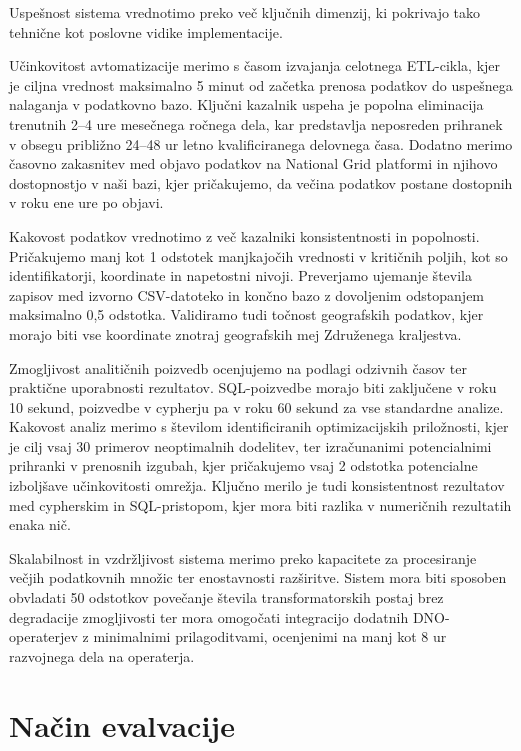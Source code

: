 \documentclass[a4paper,12pt,openright]{book}
\begin{document}
Uspešnost sistema vrednotimo preko več ključnih dimenzij, ki pokrivajo tako tehnične kot poslovne vidike implementacije.

Učinkovitost avtomatizacije merimo s časom izvajanja celotnega ETL-cikla, kjer je ciljna vrednost maksimalno 5 minut od začetka prenosa podatkov do uspešnega nalaganja v podatkovno bazo. Ključni kazalnik uspeha je popolna eliminacija trenutnih 2–4 ure mesečnega ročnega dela, kar predstavlja neposreden prihranek v obsegu približno 24–48 ur letno kvalificiranega delovnega časa. Dodatno merimo časovno zakasnitev med objavo podatkov na National Grid platformi in njihovo dostopnostjo v naši bazi, kjer pričakujemo, da večina podatkov postane dostopnih v roku ene ure po objavi.

Kakovost podatkov vrednotimo z več kazalniki konsistentnosti in popolnosti. Pričakujemo manj kot 1 odstotek manjkajočih vrednosti v kritičnih poljih, kot so identifikatorji, koordinate in napetostni nivoji. Preverjamo ujemanje števila zapisov med izvorno CSV-datoteko in končno bazo z dovoljenim odstopanjem maksimalno 0,5 odstotka. Validiramo tudi točnost geografskih podatkov, kjer morajo biti vse koordinate znotraj geografskih mej Združenega kraljestva.

Zmogljivost analitičnih poizvedb ocenjujemo na podlagi odzivnih časov ter praktične uporabnosti rezultatov. SQL-poizvedbe morajo biti zaključene v roku 10 sekund, poizvedbe v cypherju pa v roku 60 sekund za vse standardne analize. Kakovost analiz merimo s številom identificiranih optimizacijskih priložnosti, kjer je cilj vsaj 30 primerov neoptimalnih dodelitev, ter izračunanimi potencialnimi prihranki v prenosnih izgubah, kjer pričakujemo vsaj 2 odstotka potencialne izboljšave učinkovitosti omrežja. Ključno merilo je tudi konsistentnost rezultatov med cypherskim in SQL-pristopom, kjer mora biti razlika v numeričnih rezultatih enaka nič.

Skalabilnost in vzdržljivost sistema merimo preko kapacitete za procesiranje večjih podatkovnih množic ter enostavnosti razširitve. Sistem mora biti sposoben obvladati 50 odstotkov povečanje števila transformatorskih postaj brez degradacije zmogljivosti ter mora omogočati integracijo dodatnih DNO-operaterjev z minimalnimi prilagoditvami, ocenjenimi na manj kot 8 ur razvojnega dela na operaterja.

\section{Način evalvacije}
\end{document}

